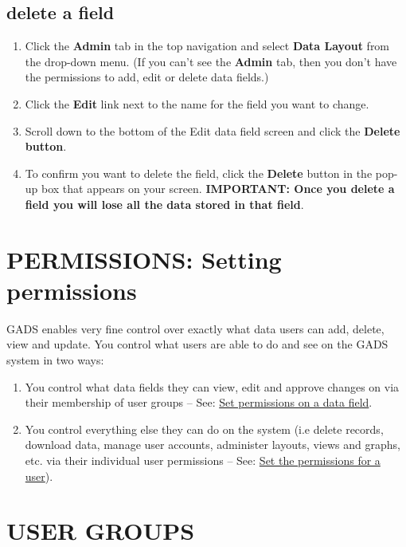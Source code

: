 \documentclass{ctrlo-int-toc}
\begin{document}
\begin{admin}
\subsection[delete a field]{delete a field}
\begin{enumerate}
\item Click the \textbf{Admin} tab in the top navigation and select \textbf{Data Layout} from the drop-down menu. (If you can't see the \textbf{Admin} tab, then you don't have the permissions to add, edit or delete data fields.)
\item Click the \textbf{Edit} link next to the name for the field you want to change.
\item Scroll down to the bottom of the Edit data field screen and click the \textbf{Delete button}.
\item To confirm you want to delete the field, click the \textbf{Delete} button in the pop-up box that appears on your screen. \textbf{IMPORTANT: Once you delete a field you will lose all the data stored in that field}. 
\end{enumerate}

\clearpage\section[PERMISSIONS: Seting permissions]{PERMISSIONS: Setting permissions}
GADS enables very fine control over exactly what data users can add, delete, view and update. You control what users are able to do and see on the GADS system in two ways:
\begin{enumerate}
    \item You control what data fields they can view, edit and approve changes on via their membership of user groups – See: \hyperref[subsec:setfieldperms]{Set permissions on a data field}.
    \item You control everything else they can do on the system (i.e delete records, download data, manage user accounts, administer layouts, views and graphs, etc. via their individual user permissions – See: \hyperref[subsec:userperms]{Set the permissions for a user}).
\end{enumerate}

\clearpage\section[USER GROUPS]{USER GROUPS}
\label{sec:usergroups}


\end{admin}
\end{document}
